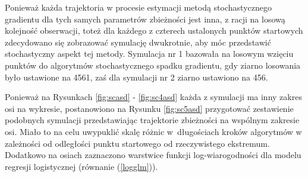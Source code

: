 Ponieważ każda trajektoria w procesie estymacji metodą stochastycznego gradientu dla tych samych parametrów zbieżności jest inna, z racji na losową kolejność obserwacji, toteż dla każdego z czterech ustalonych punktów startowych zdecydowano się zobrazować symulację dwukrotnie, aby móc przedstawić stochastyczny aspekt tej metody. Symulacja nr 1 bazowała na losowym wzięciu punktów do algorytmów stochastycznego spadku gradientu, gdy ziarno losowania było ustawione na 4561, zaś dla symulacji nr 2 ziarno ustawiono na 456.

\newpage

Ponieważ na Rysunkach \ref{fig:scasd} - \ref{fig:sc4asd} każda z symulacji ma inny zakres osi na wykresie, postanowiono na Rysunku \ref{fig:sc5asd} przygotować zestawienie podobnych symulacji przedstawiając trajektorie zbieżności na wspólnym zakresie osi. Miało to na celu uwypuklić skalę różnic w~długościach kroków algorytmów w zależności od odległości punktu startowego od rzeczywistego ekstremum. Dodatkowo na osiach zaznaczono warstwice funkcji log-wiarogodności dla modelu regresji logistycznej (równanie (\ref{logglm})).

